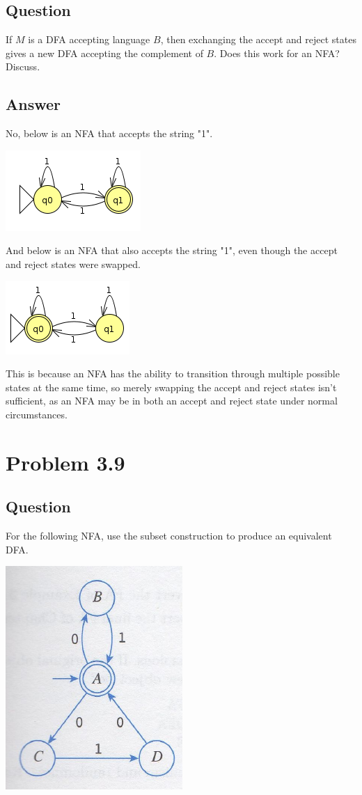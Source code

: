 \documentclass[12pt, a4paper]{article}
\begin{document}
\subsection{Question}
If $M$ is a DFA accepting language $B$, then exchanging the accept and reject states gives a new DFA accepting the complement of $B$. Does this work for an NFA? Discuss.
\subsection{Answer}
No, below is an NFA that accepts the string "1".
\begin{center}
\includegraphics[scale=0.7]{3.7a}
\end{center}
And below is an NFA that also accepts the string "1", even though the accept and reject states were swapped.
\begin{center}
\includegraphics[scale=0.7]{3.7b}
\end{center}
This is because an NFA has the ability to transition through multiple possible states at the same time, so merely swapping the accept and reject states isn't sufficient, as an NFA may be in both an accept and reject state under normal circumstances.

\section{Problem 3.9}
\subsection{Question}
For the following NFA, use the subset construction to produce an equivalent DFA.
\begin{center}
\includegraphics[scale=0.7]{3.9problem}
\end{center}
\end{document}
